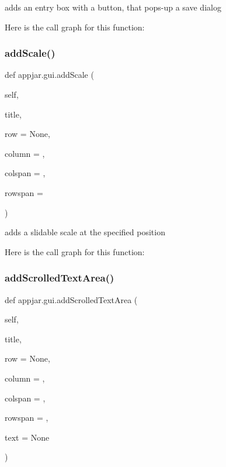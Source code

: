 \begin{DoxyVerb}adds an entry box with a button, that pops-up a save dialog \end{DoxyVerb}
 Here is the call graph for this function\+:
\mbox{\label{classappjar_1_1gui_a7344e7c1defc95790756b23b9ad9b7bb}} 
\subsubsection{\texorpdfstring{add\+Scale()}{addScale()}}
{\footnotesize\ttfamily def appjar.\+gui.\+add\+Scale (\begin{DoxyParamCaption}\item[{}]{self,  }\item[{}]{title,  }\item[{}]{row = {\ttfamily None},  }\item[{}]{column = {},  }\item[{}]{colspan = {},  }\item[{}]{rowspan = {} }\end{DoxyParamCaption})}

\begin{DoxyVerb}adds a slidable scale at the specified position \end{DoxyVerb}
 Here is the call graph for this function\+:
\mbox{\label{classappjar_1_1gui_a46cb4b1c4b777c1f2590012429897b40}} 
\subsubsection{\texorpdfstring{add\+Scrolled\+Text\+Area()}{addScrolledTextArea()}}
{\footnotesize\ttfamily def appjar.\+gui.\+add\+Scrolled\+Text\+Area (\begin{DoxyParamCaption}\item[{}]{self,  }\item[{}]{title,  }\item[{}]{row = {\ttfamily None},  }\item[{}]{column = {},  }\item[{}]{colspan = {},  }\item[{}]{rowspan = {},  }\item[{}]{text = {\ttfamily None} }\end{DoxyParamCaption})}

